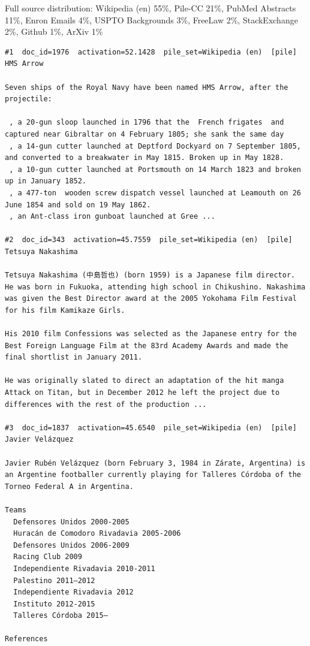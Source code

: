 Full source distribution: Wikipedia (en) 55\%, Pile-CC 21\%, PubMed Abstracts 11\%, Enron Emails 4\%, USPTO Backgrounds 3\%, FreeLaw 2\%, StackExchange 2\%, Github 1\%, ArXiv 1\%

\begin{verbatim}
#1  doc_id=1976  activation=52.1428  pile_set=Wikipedia (en)  [pile]
HMS Arrow

Seven ships of the Royal Navy have been named HMS Arrow, after the projectile:

 , a 20-gun sloop launched in 1796 that the  French frigates  and  captured near Gibraltar on 4 February 1805; she sank the same day
 , a 14-gun cutter launched at Deptford Dockyard on 7 September 1805, and converted to a breakwater in May 1815. Broken up in May 1828.
 , a 10-gun cutter launched at Portsmouth on 14 March 1823 and broken up in January 1852.
 , a 477-ton  wooden screw dispatch vessel launched at Leamouth on 26 June 1854 and sold on 19 May 1862.
 , an Ant-class iron gunboat launched at Gree ...

#2  doc_id=343  activation=45.7559  pile_set=Wikipedia (en)  [pile]
Tetsuya Nakashima

Tetsuya Nakashima (中島哲也) (born 1959) is a Japanese film director. He was born in Fukuoka, attending high school in Chikushino. Nakashima was given the Best Director award at the 2005 Yokohama Film Festival for his film Kamikaze Girls.

His 2010 film Confessions was selected as the Japanese entry for the Best Foreign Language Film at the 83rd Academy Awards and made the final shortlist in January 2011.

He was originally slated to direct an adaptation of the hit manga Attack on Titan, but in December 2012 he left the project due to differences with the rest of the production ...

#3  doc_id=1837  activation=45.6540  pile_set=Wikipedia (en)  [pile]
Javier Velázquez

Javier Rubén Velázquez (born February 3, 1984 in Zárate, Argentina) is an Argentine footballer currently playing for Talleres Córdoba of the Torneo Federal A in Argentina.

Teams
  Defensores Unidos 2000-2005
  Huracán de Comodoro Rivadavia 2005-2006
  Defensores Unidos 2006-2009
  Racing Club 2009
  Independiente Rivadavia 2010-2011
  Palestino 2011–2012
  Independiente Rivadavia 2012
  Instituto 2012-2015
  Talleres Córdoba 2015–

References
 

\end{verbatim}
